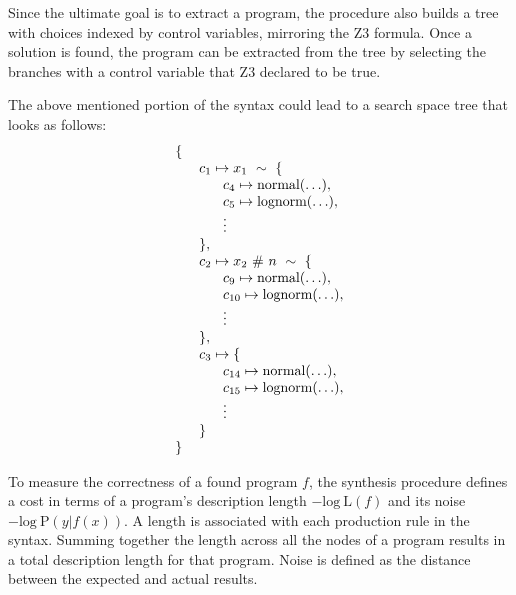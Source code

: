\documentclass[letterpaper]{llncs}
\begin{document}
Since the ultimate goal is to extract a program, the procedure also 
builds a tree with choices indexed by control variables, mirroring the Z3 formula.
Once a solution is found, the program can be extracted from the tree by selecting
the branches with a control variable that Z3 declared to be true.

The above mentioned portion of the syntax could lead to a search space tree that looks as follows:
\[
  \begin{array}{l }
    \{ \\
    \hspace{6mm} c_1 \mapsto x_1\ \sim\ \{ \\
        \hspace{12mm} c_4 \mapsto \text{normal}(\hdots), \\
        \hspace{12mm} c_5 \mapsto \text{lognorm}(\hdots), \\ 
        \hspace{12mm} \vdots \\
    \hspace{6mm}\},\\
    \hspace{6mm} c_2 \mapsto x_2\ \#\ n\ \sim\ \{ \\
        \hspace{12mm} c_9 \mapsto \text{normal}(\hdots), \\
        \hspace{12mm} c_{10} \mapsto \text{lognorm}(\hdots), \\ 
        \hspace{12mm} \vdots \\
    \hspace{6mm}\},\\
    \hspace{6mm} c_3 \mapsto \{ \\
        \hspace{12mm} c_{14} \mapsto \text{normal}(\hdots), \\
        \hspace{12mm} c_{15} \mapsto \text{lognorm}(\hdots), \\ 
        \hspace{12mm} \vdots \\
    \hspace{6mm}\}\\
    \}
    
  \end{array}
\]

To measure the correctness of a found program $f$, 
the synthesis procedure defines a cost in terms of a program's
description length $-\text{log}\ \text{L}(f)$ and its noise $-\text{log}\ \text{P}(y|f(x)) $.
A length is associated with each production rule in the syntax.
Summing together the length across all the nodes of a program results 
in a total description length for that program. 
Noise is defined as the distance between the expected and actual results.
\end{document}
